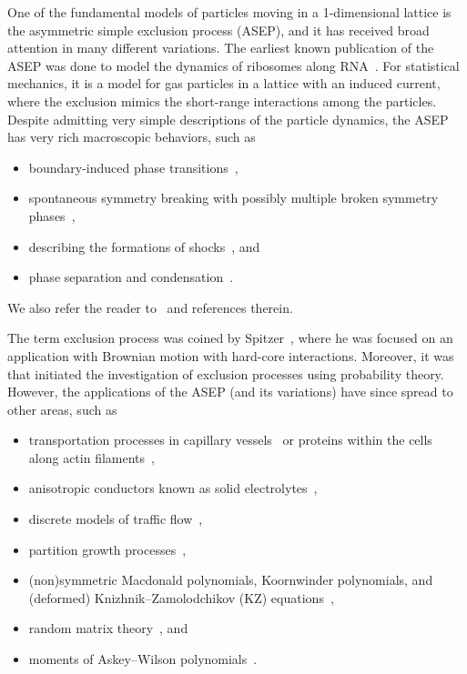 \documentclass[reqno]{amsart}
\newcommand{\0}{\phantom{c}}
\theoremstyle{plain}
\theoremstyle{definition}
\numberwithin{equation}{section}
\begin{document}
One of the fundamental models of particles moving in a 1-dimensional lattice is the asymmetric simple exclusion process (ASEP), and it has received broad attention in many different variations.
The earliest known publication of the ASEP was done to model the dynamics of ribosomes along RNA~\cite{MGP68}.
For statistical mechanics, it is a model for gas particles in a lattice with an induced current, where the exclusion mimics the short-range interactions among the particles.
Despite admitting very simple descriptions of the particle dynamics, the ASEP has very rich macroscopic behaviors, such as
\begin{itemize}
\item boundary-induced phase transitions~\cite{Krug91},
\item spontaneous symmetry breaking with possibly multiple broken symmetry phases~\cite{AHR98,AHR99,CEM01,EFGM95,EPSZ05,GLEMSS95,PK07},
\item describing the formations of shocks~\cite{DJLS93,Ferrari92,FF94,FF94II,Liggett76}, and
\item phase separation and condensation~\cite{EKKM98,JNHWW09,KLMST02,RSS00}.
\end{itemize}
We also refer the reader to~\cite{PEM09,Schutz01,SZ95,TJHJ16} and references therein.

The term exclusion process was coined by Spitzer~\cite{Spitzer70}, where he was focused on an application with Brownian motion with hard-core interactions.
Moreover, it was~\cite{Spitzer70} that initiated the investigation of exclusion processes using probability theory.
However, the applications of the ASEP (and its variations) have since spread to other areas, such as
\begin{itemize}
\item transportation processes in capillary vessels~\cite{Levitt73} or proteins within the cells along actin filaments~\cite{KNL05},
\item anisotropic conductors known as solid electrolytes~\cite{CL99},
\item discrete models of traffic flow~\cite{Schad01},
\item partition growth processes~\cite{Lam15},
\item (non)symmetric Macdonald polynomials, Koornwinder polynomials, and (deformed) Knizhnik--Zamolodchikov (KZ) equations~\cite{CdGW15,KT07},
\item random matrix theory~\cite{Johansson00,TW09}, and
\item moments of Askey--Wilson polynomials~\cite{CW11,USW04}.
\end{itemize}
\end{document}
